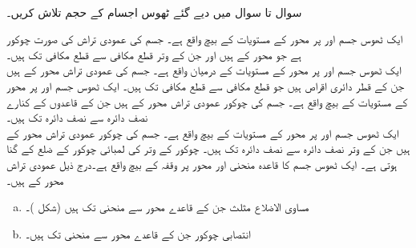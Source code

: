 \\
سوال  تا سوال  میں دیے گئے ٹھوس اجسام کے حجم تلاش کریں۔

ایک ٹھوس جسم  اور  پر  محور  کے  مستویات کے بیچ واقع ہے۔ جسم کی عمودی تراش کی صورت چوکور ہے جو  محور  کے  ہیں اور جن کے وتر قطع مکافی  سے قطع مکافی  تک ہیں۔\\
ایک ٹھوس جسم  اور  پر  محور  کے  مستویات کے درمیان  واقع ہے۔ جسم کی  عمودی تراش محور  کے  ہیں جن کے قطر دائری اقراص ہیں جو قطع مکافی  سے قطع مکافی  تک ہیں۔   
ایک ٹھوس جسم  اور  پر  محور  کے  مستویات کے بیچ واقع ہے۔ جسم کی  چوکور عمودی تراش محور  کے  ہیں جن کے  قاعدوں کے کنارے نصف دائرہ  سے نصف دائرہ  تک ہیں۔ \\
ایک ٹھوس جسم  اور  پر  محور  کے  مستویات کے بیچ واقع ہے۔ جسم کی  چوکور عمودی تراش محور  کے  ہیں جن کے وتر نصف دائرہ  سے نصف دائرہ  تک ہیں۔ چوکور کے وتر کی لمبائی چوکور کے ضلع کے  گنا ہوتی ہے۔
ایک ٹھوس جسم کا قاعدہ منحنی  اور محور  پر وقفہ   کے بیچ واقع  ہے۔درج ذیل عمودی تراش  محور  کے  ہیں۔
\begin{enumerate}[a.]
\item
مساوی الاضلاع  مثلث جن کے قاعدے محور  سے منحنی تک ہیں (شکل )۔
\item
انتصابی چوکور جن کے قاعدے محور  سے منحنی تک ہیں۔
\end{enumerate}
